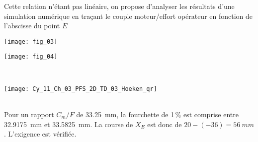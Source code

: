 


Cette relation n’étant pas linéaire, on propose d’analyser les résultats d’une
simulation numérique en traçant le couple moteur/effort opérateur en fonction de l’abscisse du point $E$

\ifprof
\else
\begin{marginfigure}
\texttt{[image: fig\_03]}
\end{marginfigure}

\begin{marginfigure}
\texttt{[image: fig\_04]}
\end{marginfigure}

\fi
{}
\ifprof
\begin{corrige}~\\
\end{corrige}
\else
\fi

\ifprof
\else
\begin{marginfigure}
\centering
\texttt{[image: Cy\_11\_Ch\_03\_PFS\_2D\_TD\_03\_Hoeken\_qr]}
\end{marginfigure}
\fi

\ifprof
\begin{corrige}~\\
Pour un rapport $C_m/F$ de \SI{33,25}{mm}, la fourchette de 1\,\% est comprise entre \SI{32,9175}{mm} et \SI{33,5825}{mm}. La course de $X_E$ est donc de $20 - (-36)=\SI{56}{mm}$. L'exigence est vérifiée.
\end{corrige}
\else
\fi


%
